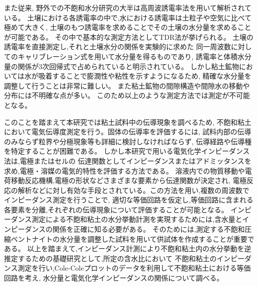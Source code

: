 また従来, 野外での不飽和水分研究の大半は高周波誘電率法を用いて解析されている。
土壌における各誘電率の中で,水における誘電率は土粒子や空気に比べて極めて大きく,
土壌のもつ誘電率を求めることでその土壌の水分量を求めることが可能である。
その中で基本的な測定方法としてTDR法が挙げられる。
土壌の誘電率を直接測定し,それと土壌水分の関係を実験的に求めた
同一周波数に対してのキャリブレーション式を用いて水分量を得るものであり,
誘電率と体積水分量の関係が3次回帰式で占められていると明示されている。
しかし粘土鉱物においては水が吸着することで膨潤性や粘性を示すようになるため,
精確な水分量を調整して行うことは非常に難しい。
また粘土鉱物の間隙構造や間隙水の移動や分布には不明確な点が多い。
このため以上のような測定方法では測定が不可能となる。

このことを踏まえて本研究では粘土試料中の伝導現象を調べるため,
不飽和粘土において電気伝導度測定を行う。固体の伝導率を評価するには,
試料内部の伝導のみならず粒界や分極現象等も詳細に検討しなければならず,
伝導経路や伝導種を特定することが困難である。
しかし本研究で用いる電気化学インピーダンス法は,電極またはセルの
伝達関数としてインピーダンスまたはアドミッタンスを求め,電極・溶媒の電気的特性を評価する方法である。
溶液内での物質移動や電荷移動反応機構,電極の形状などさまざまな要素から伝達関数が決定され,
電極反応の解析などに対し有効な手段とされている。この方法を用い,複数の周波数でインピーダンス測定を行うことで,
適切な等価回路を仮定し,等価回路に含まれる各要素を分離,それぞれの伝導現象について評価することが可能となる。
インピーダンス測定による不飽和粘土の水分挙動計測を実現するためには,含水量とインピーダンスの関係を正確に知る必要がある。
そのためには,測定する不飽和圧縮ベントナイトの水分量を調整した試料を用いて供試体を作成することが重要である。
以上を踏まえて,インピーダンス計測により不飽和粘土内の水分挙動を逆推定するための基礎研究として,所定の含水比において
不飽和粘土のインピーダンス測定を行い,Cole-Coleプロットのデータを利用して不飽和粘土における等価回路を考え,
水分量と電気化学インピーダンスの関係について調べる。
